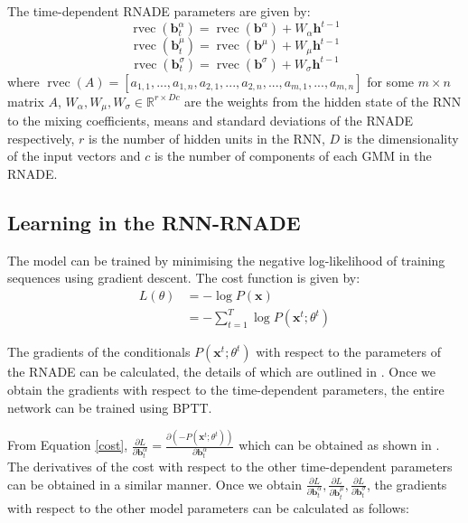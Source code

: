 \documentclass{article} %
\DeclareMathOperator{\rvec}{rvec}
\begin{document}
The time-dependent RNADE parameters are given by:
\begin{equation}
\label{one}
\rvec(\mathbf{b}^{\alpha}_{t}) = \rvec(\mathbf{b}^{\alpha}) + W_{\alpha}\mathbf{h}^{t-1}
\end{equation}
\begin{equation}
\label{two}
\rvec(\mathbf{b}^{\mu}_{t}) = \rvec(\mathbf{b}^{\mu}) + W_{\mu}\mathbf{h}^{t-1}
\end{equation}
\begin{equation}
\label{three}
\rvec(\mathbf{b}^{\sigma}_{t}) = \rvec(\mathbf{b}^{\sigma}) + W_{\sigma}\mathbf{h}^{t-1}
\end{equation}
where $\rvec(A) = [a_{1,1}, ..., a_{1,n}, a_{2,1}, ..., a_{2,n}, ..., a_{m,1}, ..., a_{m,n}]$ for some $m \times n$ matrix $A$, $W_{\alpha},W_{\mu},W_{\sigma} \in \mathbb{R}^{r \times D c}$ are the weights from the hidden state of the RNN to the mixing coefficients, means and standard deviations of the RNADE respectively, $r$ is the number of hidden units in the RNN, $D$ is the dimensionality of the input vectors and $c$ is the number of components of each GMM in the RNADE. 


\subsection{Learning in the RNN-RNADE}

The model can be trained by minimising the negative log-likelihood of training sequences using gradient descent. The cost function is given by:
\begin{align}
L(\theta) &= - \log P(\mathbf{x}) \nonumber\\ 
&= -\sum_{t=1}^{T} \log P(\mathbf{x}^t;\theta^t) \label{cost}
\end{align}

The gradients of the conditionals $P(\mathbf{x}^t;\theta^t)$ with respect to the parameters of the RNADE can be calculated, the details of which are outlined in \cite{Uria2013}. Once we obtain the gradients with respect to the time-dependent parameters, the entire network can be trained using BPTT. 

From Equation \ref{cost}, $\frac{\partial L}{\partial \mathbf{b}^{\alpha}_{t}} = \frac{\partial (-P(\mathbf{x}^t;\theta^t))}{\partial \mathbf{b}^{\alpha}_{t}}$ which can be obtained as shown in \cite{Uria2013}. The derivatives of the cost with respect to the other time-dependent parameters can be obtained in a similar manner. Once we obtain $ \frac{\partial L}{\partial \mathbf{b}^{\alpha}_{t}}, \frac{\partial L}{\partial \mathbf{b}^{\mu}_{t}}, \frac{\partial L}{\partial \mathbf{b}^{\sigma}_{t}}$, the gradients with respect to the other model parameters can be calculated as follows:
\end{document}

